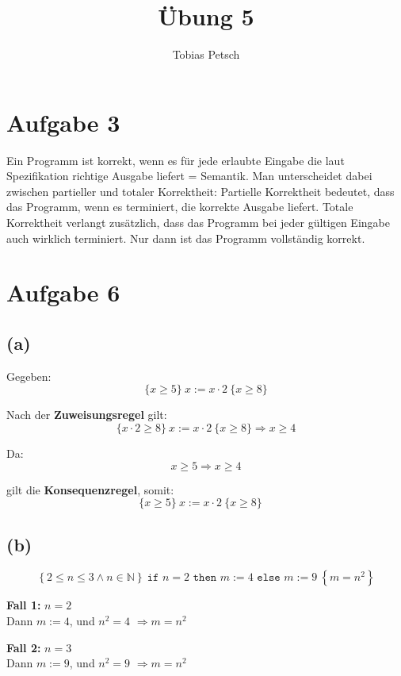 \documentclass[a4paper,12pt]{article}
\title{Übung 5}
\author{Tobias Petsch}
\date{}
\begin{document}
\maketitle

\section*{Aufgabe 3}

Ein Programm ist korrekt, wenn es für jede erlaubte Eingabe die laut Spezifikation richtige Ausgabe liefert = Semantik. 
Man unterscheidet dabei zwischen partieller und totaler Korrektheit: 
Partielle Korrektheit bedeutet, dass das Programm, wenn es terminiert, die korrekte Ausgabe liefert. 
Totale Korrektheit verlangt zusätzlich, dass das Programm bei jeder gültigen Eingabe auch wirklich terminiert. Nur dann ist das Programm vollständig korrekt.



\section*{Aufgabe 6}

\subsection*{(a)}

Gegeben:
\[
\{x \geq 5\}~x := x \cdot 2~\{x \geq 8\}
\]

Nach der \textbf{Zuweisungsregel} gilt:
\[
\{x \cdot 2 \geq 8\}~x := x \cdot 2~\{x \geq 8\}
\Rightarrow x \geq 4
\]

Da:
\[
x \geq 5 \Rightarrow x \geq 4
\]

gilt die \textbf{Konsequenzregel}, somit:
\[
\{x \geq 5\}~x := x \cdot 2~\{x \geq 8\}
\quad 
\]

\subsection*{(b)}

\[
\left\{
  2 \leq n \leq 3 \land n \in \mathbb{N}
\right\}
~\texttt{if } n = 2 \texttt{ then } m := 4 \texttt{ else } m := 9~
\left\{
  m = n^2
\right\}
\]

\textbf{Fall 1:} $n = 2$ \\
Dann $m := 4$, und $n^2 = 4$ $\Rightarrow m = n^2$ 

\textbf{Fall 2:} $n = 3$ \\
Dann $m := 9$, und $n^2 = 9$ $\Rightarrow m = n^2$ 
\end{document}
